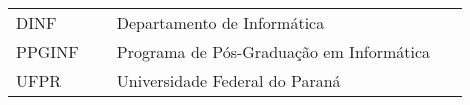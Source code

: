 

\begin{listaacron}

\begin{longtable}{p{0.2\linewidth}p{0.7\linewidth}}
DINF & Departamento de Informática\\
PPGINF & Programa de Pós-Graduação em Informática\\
UFPR & Universidade Federal do Paraná\\
\end{longtable}

\end{listaacron}

